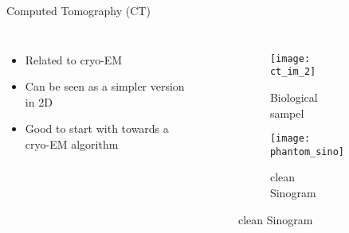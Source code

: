 

\begin{frame}[c]{Computed Tomography (CT)}
    \begin{columns}[c]
            \begin{itemize}
                \item Related to cryo-EM
                \item Can be seen as a simpler version in 2D
                \item Good to start with towards a cryo-EM algorithm
            \end{itemize}
        
        \begin{figure}
            \centering
            \begin{subfigure}[t]{0.45\textwidth}
                \texttt{[image: ct\_im\_2]}
                \caption{Biological sampel}
            \end{subfigure}\hfill                
            \begin{subfigure}[t]{0.51\textwidth}
                \texttt{[image: phantom\_sino]}
                \caption{clean Sinogram}
            \end{subfigure}\hfill          
        \end{figure}

        
    \end{columns}
\end{frame}


